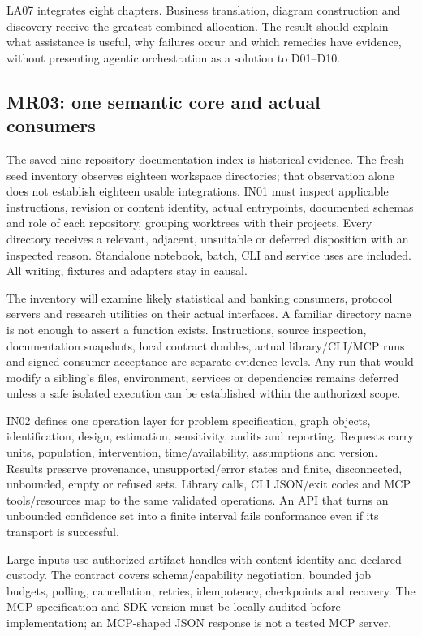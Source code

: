 \documentclass[
  11pt,
  a4paper,
]{article}
\begin{document}
LA07 integrates eight chapters. Business translation, diagram
construction and discovery receive the greatest combined allocation. The
result should explain what assistance is useful, why failures occur and
which remedies have evidence, without presenting agentic orchestration
as a solution to D01--D10.

\hypertarget{mr03-one-semantic-core-and-actual-consumers}{%
\subsection{MR03: one semantic core and actual
consumers}\label{mr03-one-semantic-core-and-actual-consumers}}

The saved nine-repository documentation index is historical evidence.
The fresh seed inventory observes eighteen workspace directories; that
observation alone does not establish eighteen usable integrations. IN01
must inspect applicable instructions, revision or content identity,
actual entrypoints, documented schemas and role of each repository,
grouping worktrees with their projects. Every directory receives a
relevant, adjacent, unsuitable or deferred disposition with an inspected
reason. Standalone notebook, batch, CLI and service uses are included.
All writing, fixtures and adapters stay in causal.

The inventory will examine likely statistical and banking consumers,
protocol servers and research utilities on their actual interfaces. A
familiar directory name is not enough to assert a function exists.
Instructions, source inspection, documentation snapshots, local contract
doubles, actual library/CLI/MCP runs and signed consumer acceptance are
separate evidence levels. Any run that would modify a sibling's files,
environment, services or dependencies remains deferred unless a safe
isolated execution can be established within the authorized scope.

IN02 defines one operation layer for problem specification, graph
objects, identification, design, estimation, sensitivity, audits and
reporting. Requests carry units, population, intervention,
time/availability, assumptions and version. Results preserve provenance,
unsupported/error states and finite, disconnected, unbounded, empty or
refused sets. Library calls, CLI JSON/exit codes and MCP tools/resources
map to the same validated operations. An API that turns an unbounded
confidence set into a finite interval fails conformance even if its
transport is successful.

Large inputs use authorized artifact handles with content identity and
declared custody. The contract covers schema/capability negotiation,
bounded job budgets, polling, cancellation, retries, idempotency,
checkpoints and recovery. The MCP specification and SDK version must be
locally audited before implementation; an MCP-shaped JSON response is
not a tested MCP server.
\end{document}
